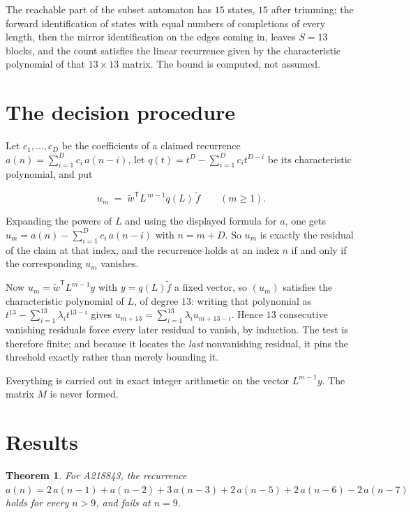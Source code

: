 \documentclass[11pt]{article}
\newtheorem{theorem}{Theorem}
\theoremstyle{definition}
\begin{document}
The reachable part of the subset automaton has $15$ states, $15$ after trimming; the forward identification of states with equal numbers of completions of every length, then the mirror identification on the edges coming in, leaves $S = 13$ blocks, and the count satisfies the linear recurrence given by the characteristic polynomial of that $13\times13$ matrix. The bound is computed, not assumed.

\section{The decision procedure}

Let $c_1,\dots,c_D$ be the coefficients of a claimed recurrence $a(n) = \sum_{i=1}^{D} c_i\,a(n-i)$, let $q(t) = t^{D} - \sum_{i=1}^{D} c_i t^{D-i}$ be its characteristic polynomial, and put

\[u_m \;=\; \tilde w^{\mathsf T} L^{\,m-1} q(L)\,\tilde f \qquad (m \ge 1).\]

Expanding the powers of $L$ and using the displayed formula for $a$, one gets $u_m = a(n) - \sum_{i=1}^{D} c_i\,a(n-i)$ with $n = m + D$. So $u_m$ is exactly the residual of the claim at that index, and the recurrence holds at an index $n$ if and only if the corresponding $u_m$ vanishes.

Now $u_m = \tilde w^{\mathsf T} L^{m-1} y$ with $y = q(L)\tilde f$ a fixed vector, so $(u_m)$ satisfies the characteristic polynomial of $L$, of degree $13$: writing that polynomial as $t^{13} - \sum_{i=1}^{13} \lambda_i t^{13-i}$ gives $u_{m+13} = \sum_{i=1}^{13} \lambda_i u_{m+13-i}$. Hence $13$ consecutive vanishing residuals force every later residual to vanish, by induction. The test is therefore finite; and because it locates the {\itshape last} nonvanishing residual, it pins the threshold exactly rather than merely bounding it.

Everything is carried out in exact integer arithmetic on the vector $L^{m-1}y$. The matrix $M$ is never formed.

\section{Results}

\begin{theorem} For A218843, the recurrence $a(n) = 2\,a(n-1) + a(n-2) + 3\,a(n-3) + 2\,a(n-5) + 2\,a(n-6) - 2\,a(n-7)$ holds for every $n > 9$, and fails at $n = 9$.\end{theorem}
\end{document}

